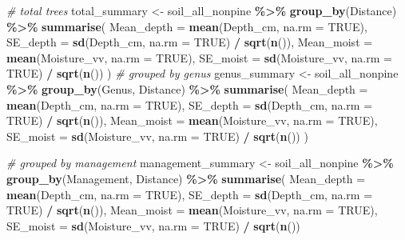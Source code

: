 \documentclass[
]{article}
\newenvironment{Shaded}{\begin{snugshade}}{\end{snugshade}}
\newcommand{\AttributeTok}[1]{\textcolor[rgb]{0.13,0.29,0.53}{#1}}
\newcommand{\CommentTok}[1]{\textcolor[rgb]{0.56,0.35,0.01}{\textit{#1}}}
\newcommand{\ConstantTok}[1]{\textcolor[rgb]{0.56,0.35,0.01}{#1}}
\newcommand{\FunctionTok}[1]{\textcolor[rgb]{0.13,0.29,0.53}{\textbf{#1}}}
\newcommand{\NormalTok}[1]{#1}
\newcommand{\OtherTok}[1]{\textcolor[rgb]{0.56,0.35,0.01}{#1}}
\newcommand{\SpecialCharTok}[1]{\textcolor[rgb]{0.81,0.36,0.00}{\textbf{#1}}}
\begin{document}
\begin{Shaded}
\begin{Highlighting}[]
\CommentTok{\# total trees }
\NormalTok{total\_summary }\OtherTok{\textless{}{-}}\NormalTok{ soil\_all\_nonpine }\SpecialCharTok{\%\textgreater{}\%}
  \FunctionTok{group\_by}\NormalTok{(Distance) }\SpecialCharTok{\%\textgreater{}\%}
   \FunctionTok{summarise}\NormalTok{(}
    \AttributeTok{Mean\_depth =} \FunctionTok{mean}\NormalTok{(Depth\_cm, }\AttributeTok{na.rm =} \ConstantTok{TRUE}\NormalTok{),}
    \AttributeTok{SE\_depth   =} \FunctionTok{sd}\NormalTok{(Depth\_cm, }\AttributeTok{na.rm =} \ConstantTok{TRUE}\NormalTok{) }\SpecialCharTok{/} \FunctionTok{sqrt}\NormalTok{(}\FunctionTok{n}\NormalTok{()), }
    \AttributeTok{Mean\_moist =} \FunctionTok{mean}\NormalTok{(Moisture\_vv, }\AttributeTok{na.rm =} \ConstantTok{TRUE}\NormalTok{),}
    \AttributeTok{SE\_moist   =} \FunctionTok{sd}\NormalTok{(Moisture\_vv, }\AttributeTok{na.rm =} \ConstantTok{TRUE}\NormalTok{) }\SpecialCharTok{/} \FunctionTok{sqrt}\NormalTok{(}\FunctionTok{n}\NormalTok{())}
\NormalTok{  )}
\CommentTok{\# grouped by genus}
\NormalTok{genus\_summary }\OtherTok{\textless{}{-}}\NormalTok{ soil\_all\_nonpine }\SpecialCharTok{\%\textgreater{}\%}
  \FunctionTok{group\_by}\NormalTok{(Genus, Distance) }\SpecialCharTok{\%\textgreater{}\%}
  \FunctionTok{summarise}\NormalTok{(}
    \AttributeTok{Mean\_depth =} \FunctionTok{mean}\NormalTok{(Depth\_cm, }\AttributeTok{na.rm =} \ConstantTok{TRUE}\NormalTok{),}
    \AttributeTok{SE\_depth   =} \FunctionTok{sd}\NormalTok{(Depth\_cm, }\AttributeTok{na.rm =} \ConstantTok{TRUE}\NormalTok{) }\SpecialCharTok{/} \FunctionTok{sqrt}\NormalTok{(}\FunctionTok{n}\NormalTok{()), }
    \AttributeTok{Mean\_moist =} \FunctionTok{mean}\NormalTok{(Moisture\_vv, }\AttributeTok{na.rm =} \ConstantTok{TRUE}\NormalTok{),}
    \AttributeTok{SE\_moist   =} \FunctionTok{sd}\NormalTok{(Moisture\_vv, }\AttributeTok{na.rm =} \ConstantTok{TRUE}\NormalTok{) }\SpecialCharTok{/} \FunctionTok{sqrt}\NormalTok{(}\FunctionTok{n}\NormalTok{())}
\NormalTok{  )}

\CommentTok{\# grouped by management}
\NormalTok{management\_summary }\OtherTok{\textless{}{-}}\NormalTok{ soil\_all\_nonpine }\SpecialCharTok{\%\textgreater{}\%}
  \FunctionTok{group\_by}\NormalTok{(Management, Distance) }\SpecialCharTok{\%\textgreater{}\%}
  \FunctionTok{summarise}\NormalTok{(}
    \AttributeTok{Mean\_depth =} \FunctionTok{mean}\NormalTok{(Depth\_cm, }\AttributeTok{na.rm =} \ConstantTok{TRUE}\NormalTok{),}
    \AttributeTok{SE\_depth   =} \FunctionTok{sd}\NormalTok{(Depth\_cm, }\AttributeTok{na.rm =} \ConstantTok{TRUE}\NormalTok{) }\SpecialCharTok{/} \FunctionTok{sqrt}\NormalTok{(}\FunctionTok{n}\NormalTok{()), }
    \AttributeTok{Mean\_moist =} \FunctionTok{mean}\NormalTok{(Moisture\_vv, }\AttributeTok{na.rm =} \ConstantTok{TRUE}\NormalTok{),}
    \AttributeTok{SE\_moist   =} \FunctionTok{sd}\NormalTok{(Moisture\_vv, }\AttributeTok{na.rm =} \ConstantTok{TRUE}\NormalTok{) }\SpecialCharTok{/} \FunctionTok{sqrt}\NormalTok{(}\FunctionTok{n}\NormalTok{())}
    

\end{Highlighting}
\end{Shaded}
\end{document}
